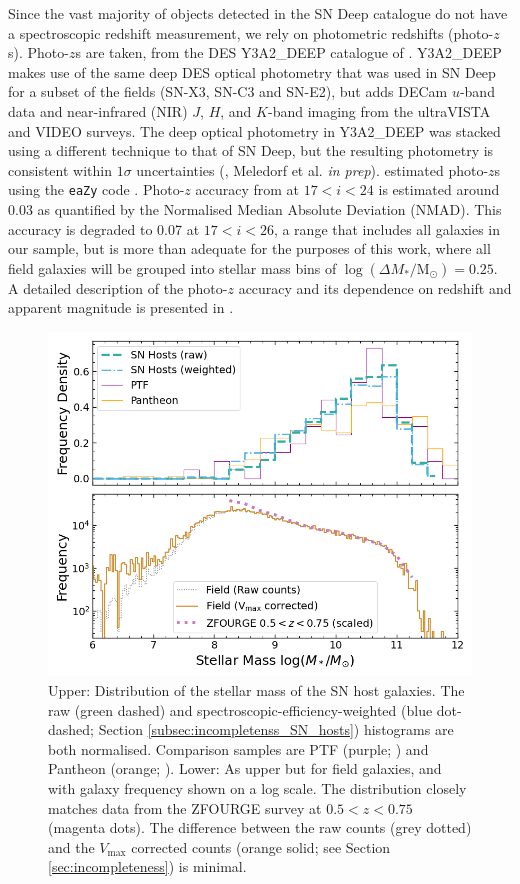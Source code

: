 \documentclass[fleqn,usenatbib]{mnras}
\begin{document}
Since the vast majority of objects detected in the SN Deep catalogue do not have a spectroscopic redshift measurement, we rely on photometric redshifts (photo-$z$s).
Photo-$z$s are taken, from the DES Y3A2\_DEEP catalogue of \citet{Hartley2020}. Y3A2\_DEEP makes use of the same deep DES optical photometry that was used in SN Deep for a subset of the fields (SN-X3, SN-C3 and SN-E2), but adds DECam $u$-band data and near-infrared (NIR) $J$, $H$, and $K$-band imaging from the ultraVISTA and VIDEO surveys. The deep optical photometry in Y3A2\_DEEP was stacked using a different technique to that of SN Deep, but the resulting photometry is consistent within $1\sigma$ uncertainties (\citealt{Wiseman2020}, Meledorf et al. \textit{in prep}). \citet{Hartley2020} estimated photo-$z$s using the \texttt{eaZy} code \citep{Brammer2008}. Photo-$z$ accuracy from \citet{Hartley2020} at $17 < i<24$ is estimated around 0.03 as quantified by the Normalised Median Absolute Deviation (NMAD). This accuracy is degraded to 0.07 at $17 < i<26$, a range that includes all galaxies in our sample, but is more than adequate for the purposes of this work, where all field galaxies will be grouped into stellar mass bins of $\log \left(\Delta M_*/\mathrm{M}_{\odot}\right) = 0.25$. A detailed description of the photo-$z$ accuracy and its dependence on redshift and apparent magnitude is presented in \citet{Hartley2020}.

\begin{figure}
    \centering
    \includegraphics[width=.5\textwidth]{figs/mass_hist_linlog_sn_field_BC03.png}
    \caption{Upper: Distribution of the stellar mass of the SN host galaxies. The raw (green dashed) and spectroscopic-efficiency-weighted (blue dot-dashed; Section \ref{subsec:incompletenss_SN_hosts}) histograms are both normalised. Comparison samples are PTF (purple; \citealt{Pan2014}) and Pantheon (orange; \citealt{Scolnic2018}). Lower: As upper but for field galaxies, and with galaxy frequency shown on a log scale.  The distribution closely matches data from the ZFOURGE survey at $0.5<z<0.75$ (magenta dots). The difference between the raw counts (grey dotted) and the $V_{\mathrm{max}}$ corrected counts (orange solid; see Section \ref{sec:incompleteness}) is minimal. 
    \label{fig:mass_hist_hosts_field}}
\end{figure}
\end{document}
